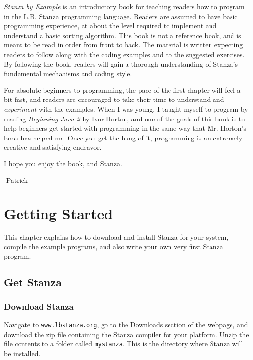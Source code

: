 \documentclass[10pt,oneside]{book}
\begin{document}
\raggedright
\maketitle


{\em Stanza by Example} is an introductory book for teaching readers how to program in the L.B. Stanza programming language. Readers are assumed to have basic programming experience, at about the level required to implement and understand a basic sorting algorithm. This book is not a reference book, and is meant to be read in order from front to back. The material is written expecting readers to follow along with the coding examples and to the suggested exercises. By following the book, readers will gain a thorough understanding of Stanza's fundamental mechanisms and coding style. 

For absolute beginners to programming, the pace of the first chapter will feel a bit fast, and readers are encouraged to take their time to understand and {\em experiment} with the examples. When I was young, I taught myself to program by reading {\em Beginning Java 2} by Ivor Horton, and one of the goals of this book is to help beginners get started with programming in the same way that Mr. Horton's book has helped me. Once you get the hang of it, programming is an extremely creative and satisfying endeavor. 

I hope you enjoy the book, and Stanza. 

  -Patrick
\tableofcontents
\chapter{Getting Started}
This chapter explains how to download and install Stanza for your system, compile the example programs, and also write your own very first Stanza program.

\section{Get Stanza}
\subsection*{Download Stanza}
Navigate to \texttt{\frenchspacing www.lbstanza.org}, go to the Downloads section of the webpage, and download the zip file containing the Stanza compiler for your platform. Unzip the file contents to a folder called \texttt{\frenchspacing mystanza}. This is the directory where Stanza will be installed.
\end{document}

